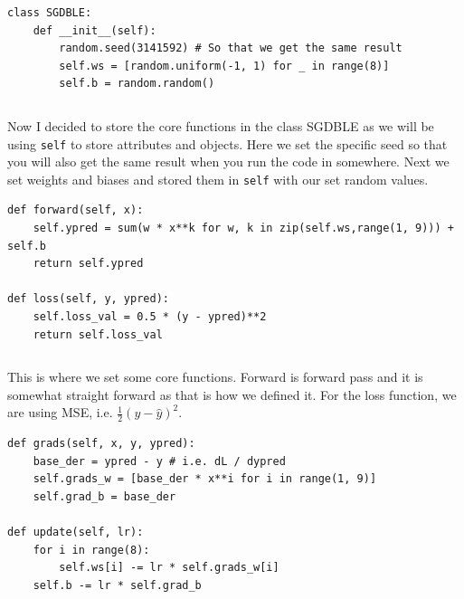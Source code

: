 \documentclass[../../../main.tex]{subfiles}
\begin{document}
\begin{jupyter}
\begin{lstlisting}[style=jin]
class SGDBLE:
    def __init__(self):
        random.seed(3141592) # So that we get the same result
        self.ws = [random.uniform(-1, 1) for _ in range(8)]
        self.b = random.random()
\end{lstlisting}
\begin{lstlisting}[style=jout]
\end{lstlisting}
\end{jupyter}

Now I decided to store the core functions in the class SGDBLE
as we will be using \verb|self| to store attributes and objects.
Here we set the specific seed so that you will also get the same
result when you run the code in somewhere. Next we set weights
and biases and stored them in \verb|self| with our set random values.

\begin{jupyter}
\begin{lstlisting}[style=jin]
def forward(self, x):
    self.ypred = sum(w * x**k for w, k in zip(self.ws,range(1, 9))) + self.b
    return self.ypred

def loss(self, y, ypred):
    self.loss_val = 0.5 * (y - ypred)**2
    return self.loss_val
\end{lstlisting}
\begin{lstlisting}[style=jout]
\end{lstlisting}
\end{jupyter}

This is where we set some core functions. Forward is forward pass
and it is somewhat straight forward as that is how we defined it.
For the loss function, we are using MSE, i.e. $\frac{1}{2} (y -
\hat{y})^2$.

\begin{jupyter}
\begin{lstlisting}[style=jin]
def grads(self, x, y, ypred):
    base_der = ypred - y # i.e. dL / dypred
    self.grads_w = [base_der * x**i for i in range(1, 9)]
    self.grad_b = base_der

def update(self, lr):
    for i in range(8):
        self.ws[i] -= lr * self.grads_w[i]
    self.b -= lr * self.grad_b
\end{lstlisting}
\begin{lstlisting}[style=jout]
\end{lstlisting}
\end{jupyter}
\end{document}
